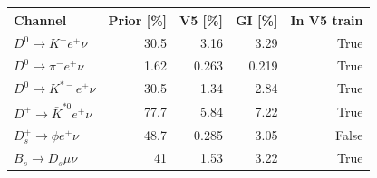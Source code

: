 \begin{tabular}{lrrrr}
\toprule
Channel & Prior [\%] & V5 [\%] & GI [\%] & In V5 train \\
\midrule
$D^0\to K^-e^+\nu$ & 30.5 & 3.16 & 3.29 & True \\
$D^0\to\pi^-e^+\nu$ & 1.62 & 0.263 & 0.219 & True \\
$D^0\to K^{*-}e^+\nu$ & 30.5 & 1.34 & 2.84 & True \\
$D^+\to\bar K^{*0}e^+\nu$ & 77.7 & 5.84 & 7.22 & True \\
$D_s^+\to\phi e^+\nu$ & 48.7 & 0.285 & 3.05 & False \\
$B_s\to D_s\mu\nu$ & 41 & 1.53 & 3.22 & True \\
\bottomrule
\end{tabular}
